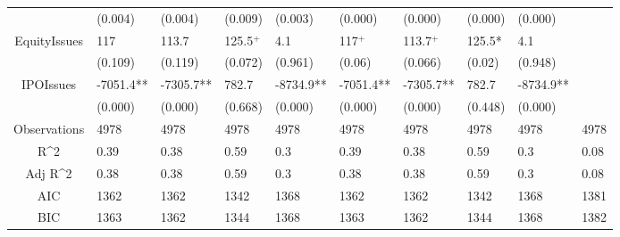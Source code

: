 \documentclass{article}
\begin{document}
\begin{table}[H]
\begin{tabular}{|clllllllll|}
   & (0.004) & (0.004) & (0.009) & (0.003) & (0.000) & (0.000) & (0.000) & (0.000) &  \\ 
  EquityIssues & 117 & 113.7 & 125.5$^{+}$ & 4.1 & 117$^{+}$ & 113.7$^{+}$ & 125.5* & 4.1 &  \\ 
   & (0.109) & (0.119) & (0.072) & (0.961) & (0.06) & (0.066) & (0.02) & (0.948) &  \\ 
  IPOIssues & -7051.4** & -7305.7** & 782.7 & -8734.9** & -7051.4** & -7305.7** & 782.7 & -8734.9** &  \\ 
   & (0.000) & (0.000) & (0.668) & (0.000) & (0.000) & (0.000) & (0.448) & (0.000) &  \\ 
  \hline 
 Observations & 4978 & 4978 & 4978 & 4978 & 4978 & 4978 & 4978 & 4978 & 4978 \\ 
  R^2 & 0.39 & 0.38 & 0.59 & 0.3 & 0.39 & 0.38 & 0.59 & 0.3 & 0.08 \\ 
  Adj R^2 & 0.38 & 0.38 & 0.59 & 0.3 & 0.38 & 0.38 & 0.59 & 0.3 & 0.08 \\ 
  AIC & 1362 & 1362 & 1342 & 1368 & 1362 & 1362 & 1342 & 1368 & 1381 \\ 
  BIC & 1363 & 1362 & 1344 & 1368 & 1363 & 1362 & 1344 & 1368 & 1382 \\ 
   \hline
\end{tabular}
 
\end{table}
\end{document}
